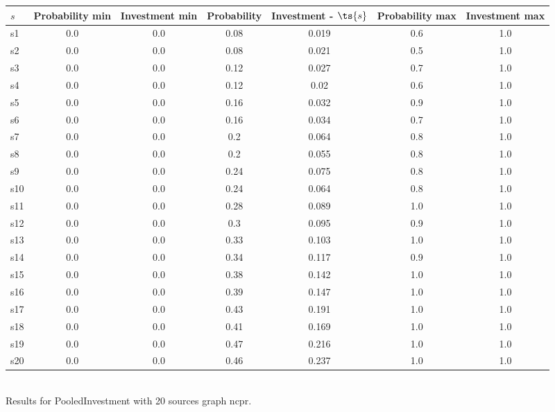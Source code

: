 \documentclass{article}
\begin{document}
\noindent\begin{tabular}{|l|c|c|c|c|c|c|}
\hline
$s$& Probability min & Investment min & Probability & Investment - $\ts{s}$ & Probability max & Investment max\\
\hline
s1 &0.0 & 0.0 & 0.08 & 0.019 & 0.6 & 1.0\\
\hline
s2 &0.0 & 0.0 & 0.08 & 0.021 & 0.5 & 1.0\\
\hline
s3 &0.0 & 0.0 & 0.12 & 0.027 & 0.7 & 1.0\\
\hline
s4 &0.0 & 0.0 & 0.12 & 0.02 & 0.6 & 1.0\\
\hline
s5 &0.0 & 0.0 & 0.16 & 0.032 & 0.9 & 1.0\\
\hline
s6 &0.0 & 0.0 & 0.16 & 0.034 & 0.7 & 1.0\\
\hline
s7 &0.0 & 0.0 & 0.2 & 0.064 & 0.8 & 1.0\\
\hline
s8 &0.0 & 0.0 & 0.2 & 0.055 & 0.8 & 1.0\\
\hline
s9 &0.0 & 0.0 & 0.24 & 0.075 & 0.8 & 1.0\\
\hline
s10 &0.0 & 0.0 & 0.24 & 0.064 & 0.8 & 1.0\\
\hline
s11 &0.0 & 0.0 & 0.28 & 0.089 & 1.0 & 1.0\\
\hline
s12 &0.0 & 0.0 & 0.3 & 0.095 & 0.9 & 1.0\\
\hline
s13 &0.0 & 0.0 & 0.33 & 0.103 & 1.0 & 1.0\\
\hline
s14 &0.0 & 0.0 & 0.34 & 0.117 & 0.9 & 1.0\\
\hline
s15 &0.0 & 0.0 & 0.38 & 0.142 & 1.0 & 1.0\\
\hline
s16 &0.0 & 0.0 & 0.39 & 0.147 & 1.0 & 1.0\\
\hline
s17 &0.0 & 0.0 & 0.43 & 0.191 & 1.0 & 1.0\\
\hline
s18 &0.0 & 0.0 & 0.41 & 0.169 & 1.0 & 1.0\\
\hline
s19 &0.0 & 0.0 & 0.47 & 0.216 & 1.0 & 1.0\\
\hline
s20 &0.0 & 0.0 & 0.46 & 0.237 & 1.0 & 1.0\\
\hline
\end{tabular}\\

\noindent Results for PooledInvestment with 20 sources graph ncpr.
\end{document}
